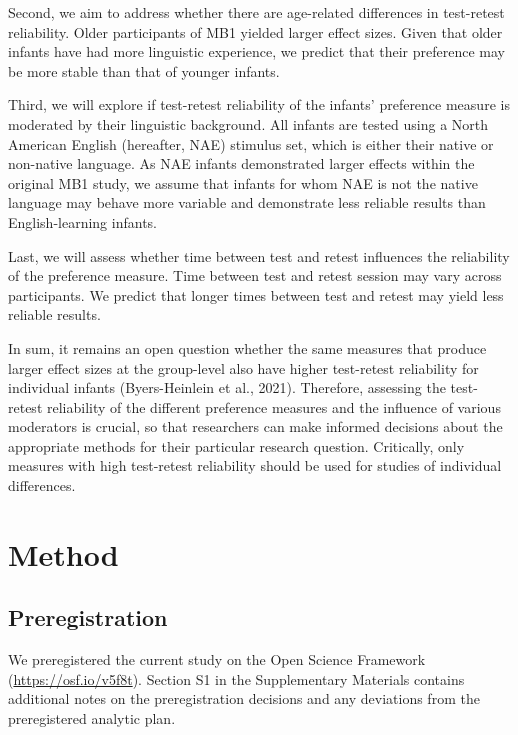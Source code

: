 \documentclass[
  english,
  man,floatsintext]{apa6}
\begin{document}
Second, we aim to address whether there are age-related differences in test-retest reliability. Older participants of MB1 yielded larger effect sizes. Given that older infants have had more linguistic experience, we predict that their preference may be more stable than that of younger infants.

Third, we will explore if test-retest reliability of the infants' preference measure is moderated by their linguistic background. All infants are tested using a North American English (hereafter, NAE) stimulus set, which is either their native or non-native language. As NAE infants demonstrated larger effects within the original MB1 study, we assume that infants for whom NAE is not the native language may behave more variable and demonstrate less reliable results than English-learning infants.

Last, we will assess whether time between test and retest influences the reliability of the preference measure. Time between test and retest session may vary across participants. We predict that longer times between test and retest may yield less reliable results.

In sum, it remains an open question whether the same measures that produce larger effect sizes at the group-level also have higher test-retest reliability for individual infants (Byers-Heinlein et al., 2021).
Therefore, assessing the test-retest reliability of the different preference measures and the influence of various moderators is crucial, so that researchers can make informed decisions about the appropriate methods for their particular research question.
Critically, only measures with high test-retest reliability should be used for studies of individual differences.

\hypertarget{method}{%
\section{Method}\label{method}}

\hypertarget{preregistration}{%
\subsection{Preregistration}\label{preregistration}}

We preregistered the current study on the Open Science Framework (\url{https://osf.io/v5f8t}). Section S1 in the Supplementary Materials contains additional notes on the preregistration decisions and any deviations from the preregistered analytic plan.
\end{document}
